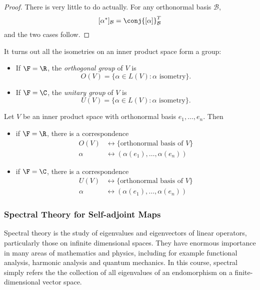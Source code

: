 \documentclass[a4paper]{article}
\newcommand*{\basis}{\mathcal}
\theoremstyle{definition}
\begin{document}
\begin{proof}
  There is very little to do actually. For any orthonormal basis \(\basis B\),
  \[
    [\alpha^*]_{\basis B} = \conj{[\alpha]}^T_{\basis B}
  \]
  and the two cases follow.
\end{proof}

It turns out all the isometries on an inner product space form a group:

\begin{definition}\leavevmode
  \begin{itemize}
  \item If \(\F = \R\), the \emph{orthogonal group} of \(V\) is
    \[
      O(V) = \{\alpha \in L(V): \alpha \text{ isometry}\}.
    \]
  \item If \(\F = \C\), the \emph{unitary group} of \(V\) is
    \[
      U(V) = \{\alpha \in L(V): \alpha \text{ isometry}\}.
    \]
  \end{itemize}
\end{definition}

\begin{lemma}
  Let \(V\) be an inner product space with orthonormal basis \(e_1, \dots, e_n\). Then
  \begin{itemize}
  \item if \(\F = \R\), there is a correspondence
    \begin{align*}
      O(V) &\leftrightarrow \{\text{orthonormal basis of } V\} \\
      \alpha &\leftrightarrow (\alpha(e_1), \dots, \alpha(e_n))
    \end{align*}
  \item if \(\F = \C\), there is a correspondence
    \begin{align*}
      U(V) &\leftrightarrow \{\text{orthonormal basis of } V\} \\
      \alpha &\leftrightarrow (\alpha(e_1), \dots, \alpha(e_n))
    \end{align*}
  \end{itemize}
\end{lemma}

\subsubsection{Spectral Theory for Self-adjoint Maps}

Spectral theory is the study of eigenvalues and eigenvectors of linear operators, particularly those on infinite dimensional spaces. They have enormous importance in many areas of mathematics and physics, including for example functional analysis, harmonic analysis and quantum mechanics. In this course, spectral simply refers the the collection of all eigenvalues of an endomorphism on a finite-dimensional vector space.
\end{document}
